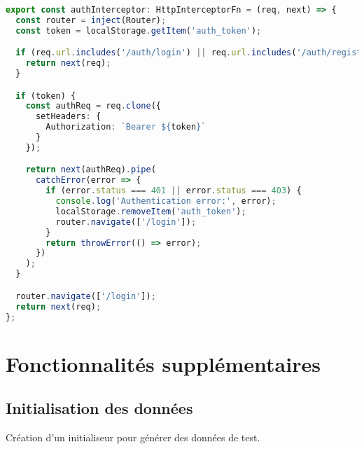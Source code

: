 \documentclass[12pt,a4paper]{report}
\newcounter{screenshotcounter}[chapter]
\begin{document}
\begin{lstlisting}[language=TypeScript, caption=auth.interceptor.ts]
export const authInterceptor: HttpInterceptorFn = (req, next) => {
  const router = inject(Router);
  const token = localStorage.getItem('auth_token');

  if (req.url.includes('/auth/login') || req.url.includes('/auth/register')) {
    return next(req);
  }

  if (token) {
    const authReq = req.clone({
      setHeaders: {
        Authorization: `Bearer ${token}`
      }
    });

    return next(authReq).pipe(
      catchError(error => {
        if (error.status === 401 || error.status === 403) {
          console.log('Authentication error:', error);
          localStorage.removeItem('auth_token');
          router.navigate(['/login']);
        }
        return throwError(() => error);
      })
    );
  }

  router.navigate(['/login']);
  return next(req);
};
\end{lstlisting}

\chapter{Fonctionnalités supplémentaires}

\section{Initialisation des données}
Création d'un initialiseur pour générer des données de test.
\end{document}

